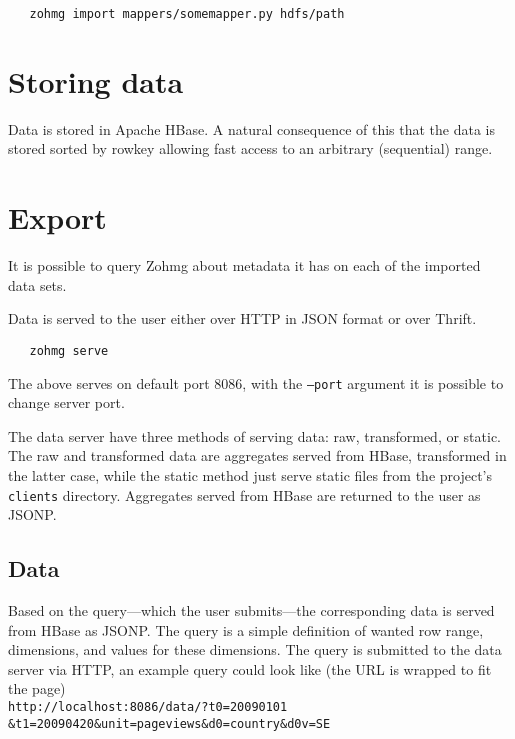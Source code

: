 \documentclass[a4paper,10pt]{book}
\begin{document}
\begin{verbatim}
   zohmg import mappers/somemapper.py hdfs/path
\end{verbatim}


\section{Storing data}

Data is stored in Apache HBase. A natural consequence of this that the
data is stored sorted by rowkey allowing fast access to an arbitrary
(sequential) range.



\section{Export}

It is possible to query Zohmg about metadata it has on each of the imported
data sets.

Data is served to the user either over HTTP in JSON format or over Thrift.

\begin{verbatim}
   zohmg serve
\end{verbatim}

\noindent The above serves on default port 8086, with the \texttt{--port}
argument it is possible to change server port.

The data server have three methods of serving data: raw, transformed, or
static. The raw and transformed data are aggregates served from HBase,
transformed in the latter case, while the static method just serve static
files from the project's \texttt{clients} directory. Aggregates served from
HBase are returned to the user as JSONP.


\subsection{Data}

Based on the query---which the user submits---the corresponding data is
served from HBase as JSONP. The query is a simple definition of wanted row
range, dimensions, and values for these dimensions. The query is submitted
to the data server via HTTP, an example query could look like (the URL is
wrapped to fit the page) \\

\texttt{http://localhost:8086/data/?t0=20090101 \\
\&t1=20090420\&unit=pageviews\&d0=country\&d0v=SE} \\
\end{document}
